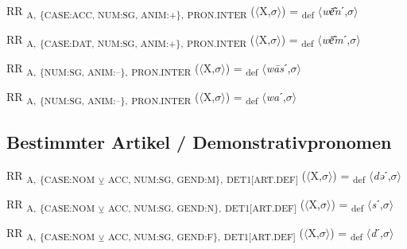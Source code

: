 {\begin{exe}
 RR \textsubscript{A,} \textsubscript{\{CASE:ACC, NUM:SG, ANIM:+\},} \textsubscript{PRON.INTER} ($\langle$X,$\sigma $$\rangle$) = \textsubscript{def} $\langle$\textit{w\=e͂n}ˊ,$\sigma $$\rangle$
\end{exe}

\begin{exe}
 RR \textsubscript{A,} \textsubscript{\{CASE:DAT, NUM:SG, ANIM:+\},} \textsubscript{PRON.INTER} ($\langle$X,$\sigma $$\rangle$) = \textsubscript{def} $\langle$\textit{w\=e͂m}ˊ,$\sigma $$\rangle$
\end{exe}

\begin{exe}
 RR \textsubscript{A,} \textsubscript{\{NUM:SG, ANIM:–\},} \textsubscript{PRON.INTER} ($\langle$X,$\sigma $$\rangle$) = \textsubscript{def} $\langle$\textit{w\=as}ˊ,$\sigma $$\rangle$
\end{exe}

\begin{exe}
 RR \textsubscript{A,} \textsubscript{\{NUM:SG, ANIM:–\},} \textsubscript{PRON.INTER} ($\langle$X,$\sigma $$\rangle$) = \textsubscript{def} $\langle$\textit{wa}ˊ,$\sigma $$\rangle$
\end{exe}

\subsection{Bestimmter Artikel / Demonstrativpronomen}

\begin{exe}
 RR \textsubscript{A,} \textsubscript{\{CASE:NOM} \textsubscript{${\veebar}$}\textsubscript{ ACC, NUM:SG, GEND:M\},} \textsubscript{DET1[ART.DEF]} ($\langle$X,$\sigma $$\rangle$) = \textsubscript{def} $\langle$\textit{də}ˊ,$\sigma $$\rangle$
\end{exe}

\begin{exe}
 RR \textsubscript{A,} \textsubscript{\{CASE:NOM} \textsubscript{${\veebar}$}\textsubscript{ ACC, NUM:SG, GEND:N\},} \textsubscript{DET1[ART.DEF]} ($\langle$X,$\sigma $$\rangle$) = \textsubscript{def} $\langle$\textit{s}ˊ,$\sigma $$\rangle$
\end{exe}

\begin{exe}
 RR \textsubscript{A,} \textsubscript{\{CASE:NOM} \textsubscript{${\veebar}$}\textsubscript{ ACC, NUM:SG, GEND:F\},} \textsubscript{DET1[ART.DEF]} ($\langle$X,$\sigma $$\rangle$) = \textsubscript{def} $\langle$\textit{d}ˊ,$\sigma $$\rangle$
\end{exe}

}
